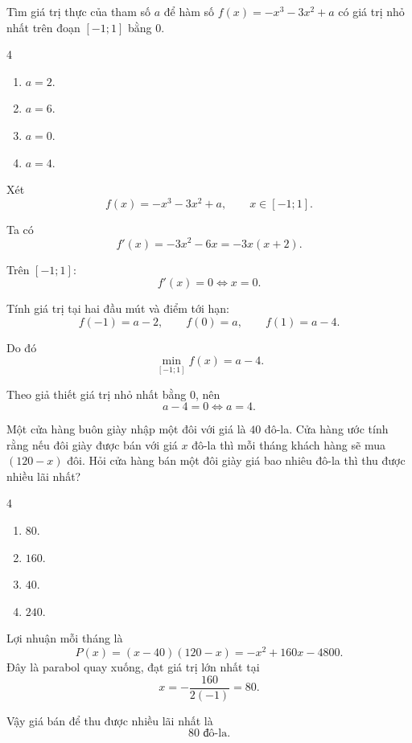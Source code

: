 \begin{baitap}
	Tìm giá trị thực của tham số $a$ để hàm số $f(x) = -x^3 - 3x^2 + a$ có giá trị nhỏ nhất trên đoạn $[-1; 1]$ bằng $0$.
	\begin{multicols}{4}
		\begin{enumerate}
			\item $a = 2$.
			\item $a = 6$.
			\item $a = 0$.
			\item $a = 4$.
		\end{enumerate}
	\end{multicols}
	\begin{traloi}
		Xét
		\[
		f(x)=-x^3-3x^2+a,\qquad x\in[-1;1].
		\]
		
		Ta có
		\[
		f'(x)=-3x^2-6x=-3x(x+2).
		\]
		
		Trên \([-1;1]\):
		\[
		f'(x)=0\iff x=0.
		\]
		
		Tính giá trị tại hai đầu mút và điểm tới hạn:
		\[
		f(-1)=a-2,\qquad f(0)=a,\qquad f(1)=a-4.
		\]
		
		Do đó
		\[
		\min_{[-1;1]}f(x)=a-4.
		\]
		
		Theo giả thiết giá trị nhỏ nhất bằng \(0\), nên
		\[
		a-4=0
		\iff \boxed{a=4}.
		\]
	\end{traloi}
\end{baitap}

\begin{baitap}
	Một cửa hàng buôn giày nhập một đôi với giá là $40$ đô-la. Cửa hàng ước tính rằng nếu đôi giày được bán với giá $x$ đô-la thì mỗi tháng khách hàng sẽ mua $(120 - x)$ đôi. Hỏi cửa hàng bán một đôi giày giá bao nhiêu đô-la thì thu được nhiều lãi nhất?
	\begin{multicols}{4}
		\begin{enumerate}
			\item $80$.
			\item $160$.
			\item $40$.
			\item $240$.
		\end{enumerate}
	\end{multicols}
	\begin{traloi}
		\dapan{A}
		Lợi nhuận mỗi tháng là
		\[
		P(x)=(x-40)(120-x)=-x^2+160x-4800.
		\]
		Đây là parabol quay xuống, đạt giá trị lớn nhất tại
		\[
		x=-\frac{160}{2(-1)}=80.
		\]
		
		Vậy giá bán để thu được nhiều lãi nhất là
		\[
		\boxed{80\text{ đô-la}}.
		\]
	\end{traloi}
\end{baitap}

